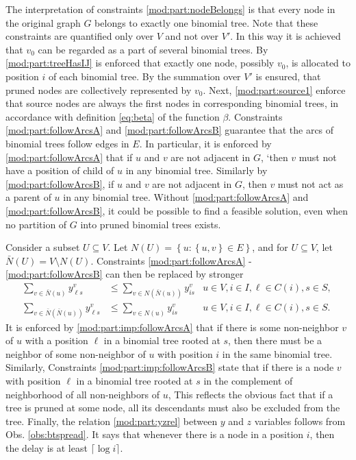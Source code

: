 The interpretation of constraints \eqref{mod:part:nodeBelongs} is that every node in the original graph $G$ belongs to exactly one binomial tree.
Note that these constraints are quantified only over $V$ and not over $V'$.
In this way it is achieved that $v_0$ can be regarded as a part of several binomial trees.
By \eqref{mod:part:treeHasIJ} is enforced that exactly one node, possibly $v_0$, is allocated to position $i$ of each binomial tree.
By the summation over $V'$ is ensured, that pruned nodes are collectively represented by $v_0$.
Next, \eqref{mod:part:source1} enforce that source nodes are always the first nodes in corresponding binomial trees, 
in accordance with definition \eqref{eq:beta} of the function $\beta$.
Constraints \eqref{mod:part:followArcsA} and \eqref{mod:part:followArcsB} guarantee that the arcs of binomial trees follow edges in $E$.
In particular, it is enforced by \eqref{mod:part:followArcsA} that if $u$ and $v$ are not adjacent in $G$, 
`then $v$ must not have a position of child of $u$ in any binomial tree.
Similarly by \eqref{mod:part:followArcsB}, if $u$ and $v$ are not adjacent in $G$, then $v$ must not act as a parent of $u$ in any binomial tree.
Without \eqref{mod:part:followArcsA} and \eqref{mod:part:followArcsB}, it could be possible to find a feasible solution, 
even when no partition of $G$ into pruned binomial trees exists.

Consider a subset $U\subseteq V$.
Let $N(U)=\left\{u:\left\{u,v\right\}\in E\right\}$, and for $U\subseteq V$, let $\bar{N}(U)=V\setminus N(U)$.
Constraints \eqref{mod:part:followArcsA} - \eqref{mod:part:followArcsB} can then be replaced by stronger
\begin{subequations}\label{mod:partition:imp}
\begin{align}
\label{mod:part:imp:followArcsA}\sum\limits_{v\in \bar{N}(u)}y^v_{\ell s}&\leq \sum\limits_{v\in N(\bar{N}(u))}y_{is}^{v} & u\in V,i\in I,\ell\in C(i), s\in S,  \\
\label{mod:part:imp:followArcsB}\sum\limits_{v\in \bar{N}(\bar{N}(u))}y^v_{\ell s}&\leq \sum\limits_{v\in N(u)} y_{is}^{v} & u\in V,i\in I,\ell\in C(i), s\in S.
\end{align}~
\end{subequations}
It is enforced by \eqref{mod:part:imp:followArcsA} that if there is some  non-neighbor $v$ of $u$  with a position $\ell$ in a binomial tree rooted at $s$,
then there must be a neighbor of some non-neighbor of $u$ with position $i$ in the same binomial tree.
Similarly, Constraints \eqref{mod:part:imp:followArcsB} state 
that if there is a node $v$ with position $\ell$ in a binomial tree rooted at $s$ in the complement of neighborhood of all non-neighbors of $u$,
This reflects the obvious fact that if a tree is pruned at some node, all its descendants must also be excluded from the tree.
Finally, the relation \eqref{mod:part:yzrel} between $y$ and $z$ variables follows from Obs. \ref{obs:btspread}.
It says that whenever there is a node in a position $i$, then the delay is at least $\lceil\log i\rceil$.

